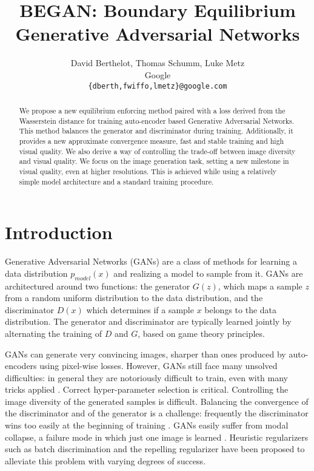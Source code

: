 \documentclass[english]{article}
\newenvironment{lyxcode}
{\par\begin{list}{}{
\setlength{\rightmargin}{\leftmargin}
\setlength{\listparindent}{0pt}\raggedright
\setlength{\itemsep}{0pt}
\setlength{\parsep}{0pt}
\normalfont\ttfamily}\item[]}
{\end{list}}
\begin{document}
\begin{lyxcode}

\end{lyxcode}

\title{BEGAN: Boundary Equilibrium Generative Adversarial Networks}


\author{David Berthelot, Thomas Schumm, Luke Metz\\ 
Google\\
\texttt{\{dberth,fwiffo,lmetz\}@google.com}}
\maketitle
\begin{abstract}
We propose a new equilibrium enforcing method paired with a loss derived
from the Wasserstein distance for training auto-encoder based Generative
Adversarial Networks. This method balances the generator and discriminator
during training. Additionally, it provides a new approximate convergence
measure, fast and stable training and high visual quality. We also
derive a way of controlling the trade-off between image diversity
and visual quality. We focus on the image generation task, setting
a new milestone in visual quality, even at higher resolutions. This
is achieved while using a relatively simple model architecture and
a standard training procedure. 
\end{abstract}

\section{Introduction}

Generative Adversarial Networks \cite{goodfellow2014generative_gan}(GANs)
are a class of methods for learning a data distribution $p_{model}(x)$
and realizing a model to sample from it. GANs are architectured around
two functions: the generator $G(z)$, which maps a sample $z$ from
a random uniform distribution to the data distribution, and the discriminator
$D(x)$ which determines if a sample $x$ belongs to the data distribution.
The generator and discriminator are typically learned jointly by alternating
the training of $D$ and $G$, based on game theory principles. 

GANs can generate very convincing images, sharper than ones produced
by auto-encoders using pixel-wise losses. However, GANs still face
many unsolved difficulties: in general they are notoriously difficult
to train, even with many tricks applied \cite{radford2015unsupervised_dcgan,salimans2016improved}.
Correct hyper-parameter selection is critical. Controlling the image
diversity of the generated samples is difficult. Balancing the convergence
of the discriminator and of the generator is a challenge: frequently
the discriminator wins too easily at the beginning of training \cite{goodfellow2016nips_gantut}.
GANs easily suffer from modal collapse, a failure mode in which just
one image is learned \cite{dumoulin2016adversarially}. Heuristic
regularizers such as batch discrimination \cite{salimans2016improved}
and the repelling regularizer \cite{zhao2016energy_ebgan} have been
proposed to alleviate this problem with varying degrees of success. 
\end{document}
